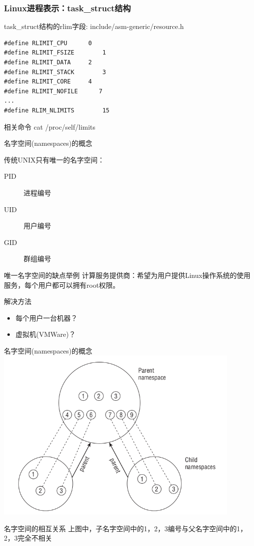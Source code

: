 \documentclass[xcolor=svgnames]{beamer}
\begin{document}
\begin{CJK*}{UTF8}{gbsn}
\begin{frame}[fragile]
\frametitle{Linux进程表示：task\_struct结构}
\begin{block}{task\_struct结构的rlim字段: include/asm-generic/resource.h}
\begin{verbatim}
#define RLIMIT_CPU      0   
#define RLIMIT_FSIZE        1  
#define RLIMIT_DATA     2   
#define RLIMIT_STACK        3 
#define RLIMIT_CORE     4   
#define RLIMIT_NOFILE      7  
...
#define RLIM_NLIMITS        15
\end{verbatim}
\end{block}
\begin{block}{相关命令}
cat /proc/self/limits
\end{block}
\end{frame}

\begin{frame}{名字空间(namespaces)的概念}

传统UNIX只有唯一的名字空间：

\begin{description}
\item[PID] 进程编号
\item[UID] 用户编号
\item[GID] 群组编号
\end{description}

\begin{block}{唯一名字空间的缺点举例}
计算服务提供商：希望为用户提供Linux操作系统的使用服务，每个用户都可以拥有root权限。
\end{block}

\begin{block}{解决方法}
\begin{itemize}
\item 每个用户一台机器？
\item 虚拟机(VMWare)？
\end{itemize}
\end{block}

\end{frame}

\begin{frame}{名字空间(namespaces)的概念}
\includegraphics[width=0.9\textwidth]{ns.png}
\begin{block}{名字空间的相互关系}
上图中，子名字空间中的1，2，3编号与父名字空间中的1，2，3完全不相关
\end{block}
\end{frame}


\end{CJK*}
\end{document}
